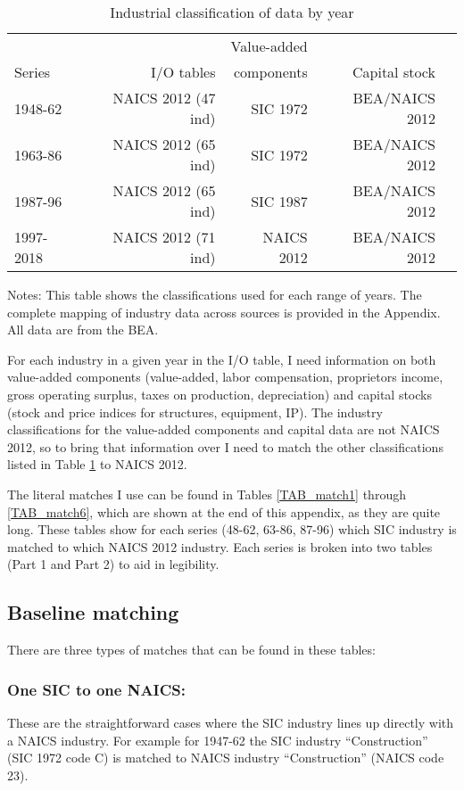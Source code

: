 \documentclass[11pt]{article}
\begin{document}
\begin{table}[!htb]
\begin{center}
\label{TAB_series}
\caption{Industrial classification of data by year}
\begin{tabular}{lrrrr}
\midrule
	    &             & Value-added   & \\
Series  & I/O tables  & components & Capital stock \\ 
\midrule
1948-62 & NAICS 2012 (47 ind) & SIC 1972 & BEA/NAICS 2012 \\
1963-86 & NAICS 2012 (65 ind) & SIC 1972 & BEA/NAICS 2012 \\
1987-96 & NAICS 2012 (65 ind) & SIC 1987 & BEA/NAICS 2012 \\
1997-2018 & NAICS 2012 (71 ind) & NAICS 2012 & BEA/NAICS 2012 \\ 
\midrule
\end{tabular}
\end{center}
{\footnotesize Notes: This table shows the classifications used for each range of years. The complete mapping of industry data across sources is provided in the Appendix. All data are from the BEA. }
\end{table}

For each industry in a given year in the I/O table, I need information on both value-added components (value-added, labor compensation, proprietors income, gross operating surplus, taxes on production, depreciation) and capital stocks (stock and price indices for structures, equipment, IP). The industry classifications for the value-added components and capital data are not NAICS 2012, so to bring that information over I need to match the other classifications listed in Table \ref{TAB_series} to NAICS 2012. 

The literal matches I use can be found in Tables \ref{TAB_match1} through \ref{TAB_match6}, which are shown at the end of this appendix, as they are quite long. These tables show for each series (48-62, 63-86, 87-96) which SIC industry is matched to which NAICS 2012 industry. Each series is broken into two tables (Part 1 and Part 2) to aid in legibility. 

\subsection{Baseline matching}
There are three types of matches that can be found in these tables:

\subsubsection{One SIC to one NAICS:} These are the straightforward cases where the SIC industry lines up directly with a NAICS industry. For example for 1947-62 the SIC industry ``Construction'' (SIC 1972 code C) is matched to NAICS industry ``Construction'' (NAICS code 23). 
\end{document}
